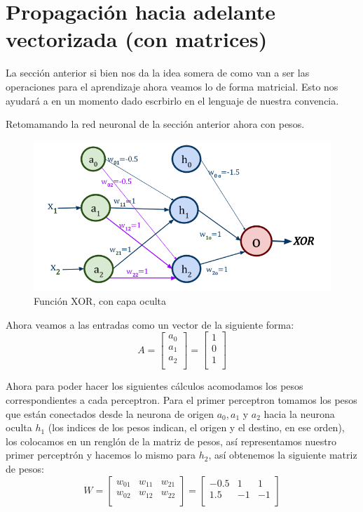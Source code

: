\section{Propagación hacia adelante vectorizada (con matrices)}

 La sección anterior si bien nos da la idea somera de como van a ser las operaciones para el aprendizaje ahora veamos lo de forma matricial. Esto nos ayudará a en un momento dado escrbirlo en el lenguaje de nuestra convencia.
 
 
 Retomamando la red neuronal de la sección anterior ahora con pesos.
 
 \begin{figure}[H]
 \centering
 \includegraphics[scale=0.5]{../Figuras/XOR_pesos.png}
 \caption{Función XOR, con capa oculta}
 \label{fig:xorPesos}
\end{figure}

Ahora veamos a las entradas como un vector de la siguiente forma:
 $$
 A =
 \begin{bmatrix}
  a_{0}\\
  a_{1}\\
  a_{2}\\
 \end{bmatrix}
 =
 \begin{bmatrix}
  1\\
  0\\
  1\\
 \end{bmatrix}
 $$
 
 Ahora para poder hacer los siguientes cálculos acomodamos los pesos correspondientes a cada perceptron. Para el primer perceptron tomamos los pesos que están conectados desde la neurona de origen $a_{0}, a_{1}$ y $a_{2}$ hacia la neurona oculta $h_{1}$ (los indices de los pesos indican, el origen y el destino, en ese orden), los colocamos en un renglón de la matriz de pesos, así representamos nuestro primer perceptrón y hacemos lo mismo para $h_{2}$, así obtenemos la siguiente matriz de pesos:
 $$
 W =
 \begin{bmatrix}
  w_{01} & w_{11} & w_{21}  \\
  w_{02} & w_{12} & w_{22}\\
 \end{bmatrix}
 =
 \begin{bmatrix}
  -0.5 & 1 & 1\\
  1.5 & -1 & -1\\
 \end{bmatrix}
 $$
 
